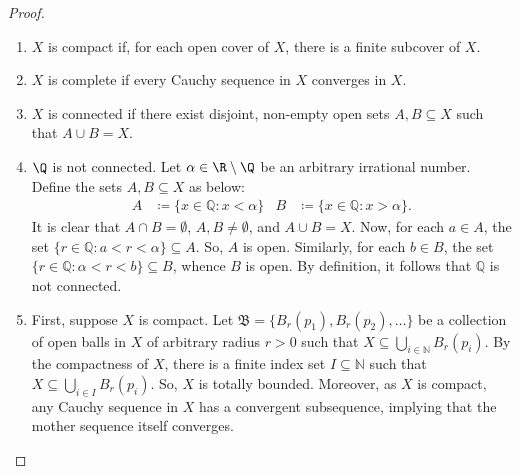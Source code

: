 \documentclass{article}
\begin{document}
\begin{proof}\leavevmode
	\begin{enumerate}
		\item \(X\) is compact if, for each open cover of \(X\), there is a finite subcover of \(X\).
		\item \(X\) is complete if every Cauchy sequence in \(X\) converges in \(X\).
		\item \(X\) is connected if there exist disjoint, non-empty open sets
		      \(A, B\subseteq X\) such that \(A\cup  B = X\).
		\item \(\Q\) is not connected.  Let \(\alpha\in \R\setminus \Q\) be
		      an arbitrary irrational number.  Define the sets \(A, B\subseteq
		      X\) as below:
		      \begin{align*}
			      A & \coloneqq \{x\in \mathbb{Q} : x < \alpha\} & B & \coloneqq \{x\in \mathbb{Q} : x > \alpha\}
			      .\end{align*}
		      It is clear that \(A\cap B = \emptyset\), \(A, B \neq \emptyset\),
		      and \(A\cup B = X\).  Now, for each \(a\in A\), the set \(\{r\in
		      \mathbb{Q} : a < r < \alpha\}\subseteq A\).  So, \(A\) is open.
		      Similarly, for each \(b\in B\), the set \(\{r\in \mathbb{Q} :
		      \alpha < r < b\}\subseteq B\), whence \(B\) is open.  By
		      definition, it follows that \(\mathbb{Q}\) is not connected.
		\item First, suppose \(X\) is compact.  Let \(\mathfrak{B} = \{B_r(p_1),
		      B_r(p_2), \dots\}\) be a collection of open balls in \(X\) of
		      arbitrary radius \(r>0\) such that \(X\subseteq \bigcup_{i\in
			      \mathbb{N}} B_r(p_i)\).  By the compactness of \(X\), there is a
		      finite index set \(I\subseteq \mathbb{N}\) such that \(X\subseteq
		      \bigcup_{i\in I} B_r(p_i)\).  So, \(X\) is totally bounded.
		      Moreover, as \(X\) is compact, any Cauchy sequence in \(X\) has a
		      convergent subsequence, implying that the mother sequence itself
		      converges.


\end{enumerate}
\end{proof}
\end{document}
